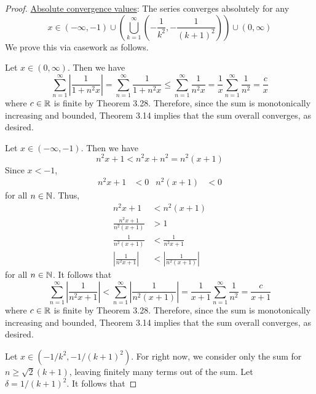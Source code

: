 \documentclass[../psets.tex]{subfiles}
\begin{document}
\begin{enumerate}[label={\textbf{\arabic*.}}]
\begin{proof}
        \underline{Absolute convergence values}: The series converges absolutely for any
        \begin{equation*}
            x \in (-\infty,-1)\cup\left( \bigcup_{k=1}^\infty\left( -\frac{1}{k^2},-\frac{1}{(k+1)^2} \right) \right)\cup(0,\infty)
        \end{equation*}
        We prove this via casework as follows.\par
        Let $x\in(0,\infty)$. Then we have
        \begin{equation*}
            \sum_{n=1}^\infty\left| \frac{1}{1+n^2x} \right| = \sum_{n=1}^\infty\frac{1}{1+n^2x}
            \leq \sum_{n=1}^\infty\frac{1}{n^2x}
            = \frac{1}{x}\sum_{n=1}^\infty\frac{1}{n^2}
            = \frac{c}{x}
        \end{equation*}
        where $c\in\mathbb{R}$ is finite by Theorem 3.28. Therefore, since the sum is monotonically increasing and bounded, Theorem 3.14 implies that the sum overall converges, as desired.\par
        Let $x\in(-\infty,-1)$. Then we have
        \begin{equation*}
            n^2x+1 < n^2x+n^2 = n^2(x+1)
        \end{equation*}
        Since $x<-1$,
        \begin{align*}
            n^2x+1 &< 0&
            n^2(x+1) &< 0
        \end{align*}
        for all $n\in\mathbb{N}$. Thus,
        \begin{align*}
            n^2x+1 &< n^2(x+1)\\
            \frac{n^2x+1}{n^2(x+1)} &> 1\\
            \frac{1}{n^2(x+1)} &< \frac{1}{n^2x+1}\\
            \left| \frac{1}{n^2x+1} \right| &< \left| \frac{1}{n^2(x+1)} \right|
        \end{align*}
        for all $n\in\mathbb{N}$. It follows that
        \begin{equation*}
            \sum_{n=1}^\infty\left| \frac{1}{n^2x+1} \right| < \sum_{n=1}^\infty\left| \frac{1}{n^2(x+1)} \right|
            = \frac{1}{x+1}\sum_{n=1}^\infty\frac{1}{n^2}
            = \frac{c}{x+1}
        \end{equation*}
        where $c\in\mathbb{R}$ is finite by Theorem 3.28. Therefore, since the sum is monotonically increasing and bounded, Theorem 3.14 implies that the sum overall converges, as desired.\par
        Let $x\in(-1/k^2,-1/(k+1)^2)$. For right now, we consider only the sum for $n\geq\sqrt{2}(k+1)$, leaving finitely many terms out of the sum. Let $\delta=1/(k+1)^2$. It follows that

\end{proof}
\end{enumerate}
\end{document}

